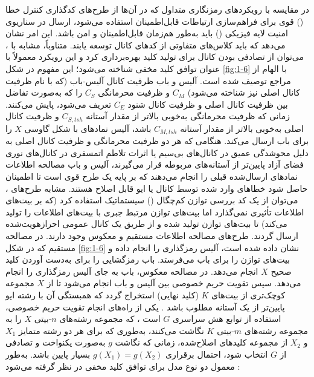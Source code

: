 در مقایسه با رویکردهای رمزنگاری متداول که در آن‌ها از طرح‌های کدگذاری کنترل خطا () قوی برای فراهم‌سازی ارتباطات قابل‌اطمینان استفاده می‌شود، ارسال در سناریوی امنیت لایه فیزیکی () باید به‌طور هم‌زمان قابل‌اطمینان و امن باشد. این امر نشان می‌دهد که باید کلاس‌های متفاوتی از کدهای کانال توسعه یابند. متناوباً، مشابه با ، می‌توان از تصادفی بودن کانال برای تولید کلید بهره‌برداری کرد و این رویکرد معمولاً با عنوان توافق کلید مخفی شناخته می‌شود؛ این مفهوم در شکل \ref{fig:1-6} با الهام از مراجع \cite{1-2, 1-3, 1-6} توصیف شده است. آلیس و باب ظرفیت کانال آلیس-باب (که با نام ظرفیت کانال اصلی نیز شناخته می‌شود) $C_M$ و ظرفیت محرمانگی $C_S$ را که به‌صورت تفاضل بین ظرفیت کانال اصلی و ظرفیت کانال شنود $C_E$ تعریف می‌شود، پایش می‌کنند. زمانی که ظرفیت محرمانگی به‌خوبی بالاتر از مقدار آستانه $C_{S,tsh}$ و ظرفیت کانال اصلی به‌خوبی بالاتر از مقدار آستانه $C_{M,tsh}$ باشد، آلیس نمادهای با شکل گاوسی $X$ را برای باب ارسال می‌کند. هنگامی که هر دو ظرفیت محرمانگی و ظرفیت کانال اصلی به دلیل محوشدگی عمیق در کانال‌های بی‌سیم یا اثرات تلاطم اتمسفری در کانال‌های نوری فضای آزاد پایین‌تر از آستانه‌های مربوطه قرار می‌گیرند، آلیس و باب مصالحه اطلاعات نمادهای ارسال‌شده قبلی را انجام می‌دهند که بر پایه یک طرح  قوی است تا اطمینان حاصل شود خطاهای وارد شده توسط کانال یا ایو قابل اصلاح هستند. مشابه طرح‌های  \cite{1-7, 1-8, 1-9, 1-10, 1-11}، می‌توان از یک کد بررسی توازن کم‌چگال () سیستماتیک استفاده کرد (که بر بیت‌های اطلاعات تأثیری نمی‌گذارد اما بیت‌های توازن مرتبط جبری با بیت‌های اطلاعات را تولید می‌کند) تا بیت‌های توازن تولید شده و از طریق یک کانال عمومی احرازهویت‌شده ارسال گردند. طرح‌های مصالحه اطلاعات مستقیم و معکوس وجود دارند. در مصالحه مستقیم که در شکل \ref{fig:1-6} نشان داده شده است، آلیس رمزگذاری  را انجام داده و بیت‌های توازن را برای باب می‌فرستد. باب رمزگشایی  را برای به‌دست آوردن کلید صحیح $X$ انجام می‌دهد. در مصالحه معکوس، باب به جای آلیس رمزگذاری  را انجام می‌دهد. سپس تقویت حریم خصوصی بین آلیس و باب انجام می‌شود تا از $X$ مجموعه کوچک‌تری از بیت‌های $K$ (کلید نهایی) استخراج گردد که همبستگی آن با رشته ایو پایین‌تر از یک آستانه مطلوب باشد \cite{1-9, 1-10, 1-11, 1-33}. یکی از راه‌های انجام تقویت حریم خصوصی، استفاده از توابع هش سراسری $G$ است \cite{1-9, 1-10, 1-11, 1-33}، که مجموعه رشته‌های $n$-بیتی $X$ را به مجموعه رشته‌های $m$-بیتی $K$ نگاشت می‌کنند، به‌طوری که برای هر دو رشته متمایز $X_1$ و $X_2$ از مجموعه کلیدهای اصلاح‌شده، زمانی که نگاشت $g$ به‌صورت یکنواخت و تصادفی از $G$ انتخاب شود، احتمال برقراری $g(X_1) = g(X_2)$ بسیار پایین باشد. به‌طور معمول دو نوع مدل برای توافق کلید مخفی در نظر گرفته می‌شود \cite{1-34}:

